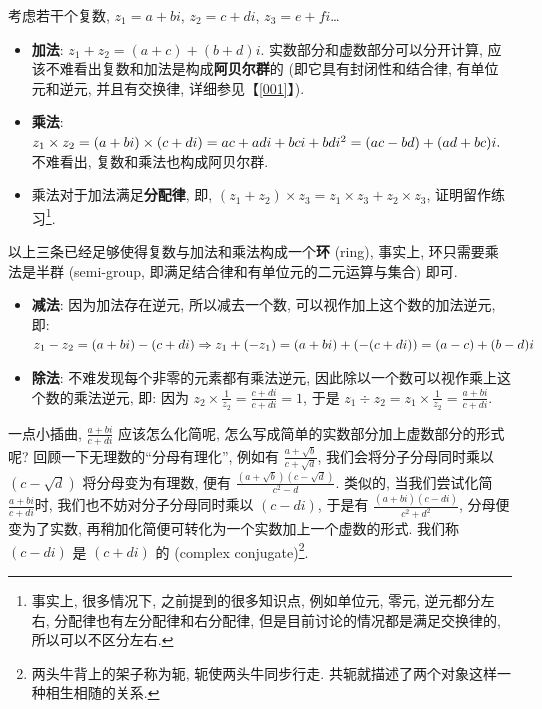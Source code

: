 \begin{tcolorbox}[size=fbox, breakable, enhanced jigsaw, title={运算规律}]

考虑若干个复数, $z_1=a+bi$, $z_2=c+di$, $z_3=e+fi$\ldots{}

\begin{itemize}

\item
  \textbf{加法}: $z_1+z_2=(a+c)+(b+d)i$.
  实数部分和虚数部分可以分开计算,
  应该不难看出复数和加法是构成\textbf{阿贝尔群}的
  (即它具有封闭性和结合律, 有单位元和逆元, 并且有交换律, 详细参见【\ref{001}】).
\item
  \textbf{乘法}:
  $z_1\times z_2=(a+bi)\times(c+di)\\=ac+adi+bci+bdi^2=(ac-bd)+(ad+bc)i.$
  不难看出, 复数和乘法也构成阿贝尔群.
\item
  乘法对于加法满足\textbf{分配律}, 即,
  $(z_1+z_2)\times z_3=z_1\times z_3+z_2\times z_3$,
  证明留作练习\footnote{事实上, 很多情况下, 之前提到的很多知识点,
    例如单位元, 零元, 逆元都分左右, 分配律也有左分配律和右分配律,
    但是目前讨论的情况都是满足交换律的, 所以可以不区分左右.}.
\end{itemize}

以上三条已经足够使得复数与加法和乘法构成一个\textbf{环} (ring), 事实上,
环只需要乘法是半群 (semi-group, 即满足结合律和有单位元的二元运算与集合) 即可.

\begin{itemize}

\item
  \textbf{减法}: 因为加法存在逆元, 所以减去一个数,
  可以视作加上这个数的加法逆元, 即:
  $z_1-z_2=(a+bi)-(c+di)\\\Rightarrow z_1+(-z_1)=(a+bi)+(-(c+di))=(a-c)+(b-d)i$
\item
  \textbf{除法}: 不难发现每个非零的元素都有乘法逆元,
  因此除以一个数可以视作乘上这个数的乘法逆元, 即: 因为
  $z_2\times\frac{1}{z_2}=\frac{c+di}{c+di}=1$, 于是
  $z_1\div z_2=z_1\times\frac{1}{z_2}=\frac{a+bi}{c+di}$.
\end{itemize}

\begin{newquote}
一点小插曲, $\frac{a+bi}{c+di}$ 应该怎么化简呢,
怎么写成简单的实数部分加上虚数部分的形式呢?
回顾一下无理数的``分母有理化'', 例如有
$\frac{a+\sqrt{b}}{c+\sqrt{d}}$, 我们会将分子分母同时乘以
$(c-\sqrt{d})$ 将分母变为有理数, 便有
$\frac{(a+\sqrt{b})(c-\sqrt{d})}{c^2-d}$. 类似的, 当我们尝试化简
$\frac{a+bi}{c+di}$时, 我们也不妨对分子分母同时乘以 $(c-di)$, 于是有
$\frac{(a+bi)(c-di)}{c^2+d^2}$, 分母便变为了实数,
再稍加化简便可转化为一个实数加上一个虚数的形式. 我们称 $(c-di)$ 是
$(c+di)$ 的 (complex conjugate)\footnote{两头牛背上的架子称为轭,
  轭使两头牛同步行走. 共轭就描述了两个对象这样一种相生相随的关系.}.
\end{newquote}


\end{tcolorbox}
